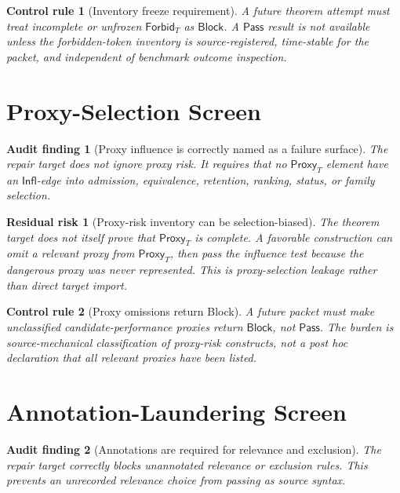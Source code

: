 \documentclass[11pt]{article}
\newcommand{\ForbidT}{\mathsf{Forbid}_{T}}
\newcommand{\ProxyT}{\mathsf{Proxy}_{T}}
\newcommand{\Influence}{\mathsf{Infl}}
\newcommand{\Pass}{\mathsf{Pass}}
\newcommand{\Block}{\mathsf{Block}}
\newtheorem{auditfinding}{Audit finding}
\newtheorem{residualrisk}{Residual risk}
\newtheorem{controlrule}{Control rule}
\begin{document}
\begin{controlrule}[Inventory freeze requirement]
A future theorem attempt must treat incomplete or unfrozen \(\ForbidT\) as
\(\Block\). A \(\Pass\) result is not available unless the forbidden-token
inventory is source-registered, time-stable for the packet, and independent
of benchmark outcome inspection.
\end{controlrule}

\section{Proxy-Selection Screen}

\begin{auditfinding}[Proxy influence is correctly named as a failure surface]
The repair target does not ignore proxy risk. It requires that no
\(\ProxyT\) element have an \(\Influence\)-edge into admission,
equivalence, retention, ranking, status, or family selection.
\end{auditfinding}

\begin{residualrisk}[Proxy-risk inventory can be selection-biased]
The theorem target does not itself prove that \(\ProxyT\) is complete. A
favorable construction can omit a relevant proxy from \(\ProxyT\), then
pass the influence test because the dangerous proxy was never represented.
This is proxy-selection leakage rather than direct target import.
\end{residualrisk}

\begin{controlrule}[Proxy omissions return Block]
A future packet must make unclassified candidate-performance proxies return
\(\Block\), not \(\Pass\). The burden is source-mechanical classification of
proxy-risk constructs, not a post hoc declaration that all relevant proxies
have been listed.
\end{controlrule}

\section{Annotation-Laundering Screen}

\begin{auditfinding}[Annotations are required for relevance and exclusion]
The repair target correctly blocks unannotated relevance or exclusion rules.
This prevents an unrecorded relevance choice from passing as source syntax.
\end{auditfinding}
\end{document}
